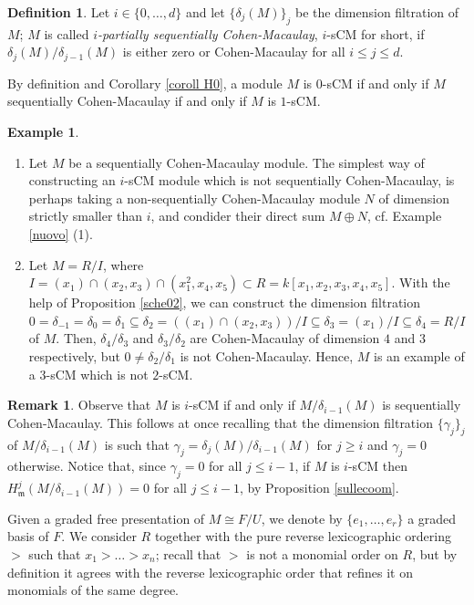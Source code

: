 \documentclass[12pt]{amsart}
\theoremstyle{definition}
\theoremstyle{definition}
\newtheorem{remark}[theorem]{Remark}
\newtheorem{example}[theorem]{Example}
\newtheorem{definition}[theorem]{Definition}
\newcommand{\m}{\mathfrak{m}}
\renewcommand{\leq}{\leqslant}
\renewcommand{\geq}{\geqslant}
\begin{document}
\begin{definition} \label{Def i-sCM} Let $i\in\{0,\ldots,d\}$ and let $\{\delta_j(M)\}_j$ be the dimension filtration of $M$; $M$ is called {\it $i$-partially sequentially Cohen-Macaulay}, $i$-sCM for short, if $\delta_j(M)/\delta_{j-1}(M)$ is either zero or Cohen-Macaulay for all $i \leq j \leq d$. 
  \end{definition}

  \noindent
  By definition and Corollary \ref{coroll H0}, a module $M$ is $0$-sCM if and only if $M$ sequentially Cohen-Macaulay  if and only if $M$ is $1$-sCM.

  \begin{example}\label{Example i-sCM}
    \begin{enumerate}[(1)] 
\item Let $M$ be a sequentially Cohen-Macaulay module. The simplest way of constructing an $i$-sCM module which is not sequentially Cohen-Macaulay, is perhaps taking a non-sequentially Cohen-Macaulay module $N$ of dimension strictly smaller than $i$, and condider  their direct sum $M \oplus N$, cf. Example \ref{nuovo} (1).

  \item Let $M=R/I$, where $I=(x_1) \cap (x_2,x_3) \cap (x_1^2,x_4,x_5) \subset R=k[x_1,x_2,x_3,x_4,x_5]$. With the help of Proposition \ref{sche02}, we can construct the dimension filtration $0=\delta_{-1}=\delta_0 = \delta_1 \subseteq  \delta_2=((x_1) \cap (x_2,x_3))/I \subseteq \delta_3=(x_1)/I \subseteq \delta_4=R/I$ of $M$. Then,  $\delta_4/\delta_3$ and $\delta_3/\delta_2$ are Cohen-Macaulay of dimension $4$ and $3$ respectively, but $0\neq \delta_2/\delta_1$ is not Cohen-Macaulay. Hence, $M$ is an example of a $3$-sCM which is not  $2$-sCM.    
  \end{enumerate}

\end{example}


\begin{remark}\label{remark jsCM-0}
Observe that $M$ is $i$-sCM if and only if $M/\delta_{i-1}(M)$ is sequentially Cohen-Macaulay. This follows at once  recalling that the dimension filtration $\{\gamma_j\}_j$ of $M/\delta_{i-1}(M)$ is such that  $\gamma_j = \delta_j(M)/\delta_{i-1}(M)$ for $j \geq i$ and $\gamma_j=0$ otherwise. Notice that, since  $\gamma_j=0$ for all $j \leq i-1$, if $M$ is $i$-sCM then  $H^j_\m(M/\delta_{i-1}(M)) = 0$ for all $j \leq i-1$, by Proposition \ref{sullecoom}.
\end{remark}
Given a graded free presentation of $M \cong F/U$, we  denote by $\{e_1, \ldots, e_r\}$  a graded basis of $F$. We consider $R$ together with the pure reverse lexicographic ordering $>$ such that $x_1 > \ldots > x_n $; recall that $>$ is not a monomial order on $R$, but by definition it agrees with the reverse lexicographic order that refines it on monomials of the same degree. 
\end{document}
